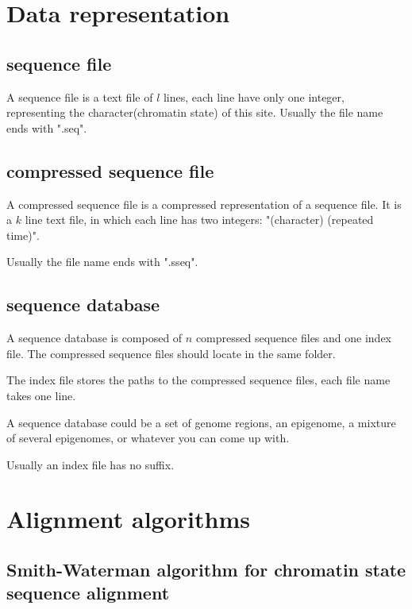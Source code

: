 \documentclass[a4paper]{article}
\begin{document}
\begin{CJK*}{UTF8}{kai}

\section{Data representation}
\subsection{sequence file}

A sequence file is a text file of $l$ lines, each line have only one integer, representing the character(chromatin state) of this site. Usually the file name ends with ".seq".

\subsection{compressed sequence file}

A compressed sequence file is a compressed representation of a sequence file. It is a $k$ line text file, in which each line has two integers: "(character) (repeated time)".

Usually the file name ends with ".sseq".

\subsection{sequence database}

A sequence database is composed of $n$ compressed sequence files and one index file. The compressed sequence files should locate in the same folder.

The index file stores the paths to the compressed sequence files, each file name takes one line.

A sequence database could be a set of genome regions, an epigenome, a mixture of several epigenomes, or whatever you can come up with.

Usually an index file has no suffix.

\section{Alignment algorithms}

\subsection{Smith-Waterman algorithm for chromatin state sequence alignment}


\end{CJK*}
\end{document}
